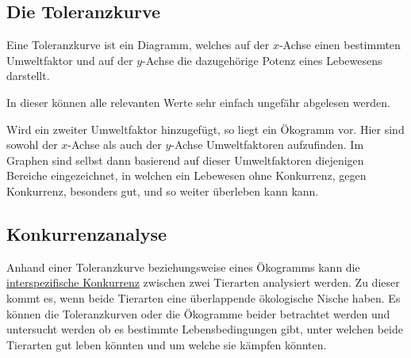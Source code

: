 \documentclass{article}
\begin{document}
\subsection{Die Toleranzkurve}
Eine Toleranzkurve ist ein Diagramm, welches auf der $x$-Achse einen bestimmten Umweltfaktor und auf der $y$-Achse die dazugehörige Potenz eines Lebewesens darstellt.
 
In dieser können alle relevanten Werte sehr einfach ungefähr abgelesen werden.  
\begin{center} 
\end{center}
 
Wird ein zweiter Umweltfaktor hinzugefügt, so liegt ein Ökogramm vor. Hier sind sowohl der $x$-Achse als auch der $y$-Achse Umweltfaktoren aufzufinden. Im Graphen sind selbst dann basierend auf dieser Umweltfaktoren diejenigen Bereiche eingezeichnet, in welchen ein Lebewesen ohne Konkurrenz, gegen Konkurrenz, besonders gut, und so weiter überleben kann kann.

\subsection{Konkurrenzanalyse}
Anhand einer Toleranzkurve beziehungsweise eines Ökogramms kann die \hyperref[Konkurrenz]{interspezifische Konkurrenz} zwischen zwei Tierarten analysiert werden. Zu dieser kommt es, wenn beide Tierarten eine überlappende ökologische Nische haben. Es können die Toleranzkurven oder die Ökogramme beider betrachtet werden und untersucht werden ob es bestimmte Lebensbedingungen gibt, unter welchen beide Tierarten gut leben könnten und um welche sie kämpfen könnten.
\end{document}
